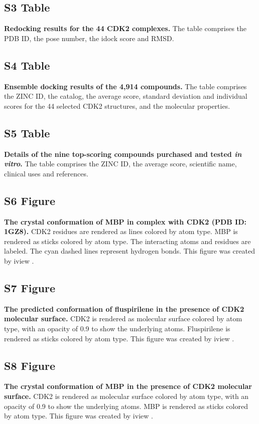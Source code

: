 \documentclass[10pt,letterpaper]{article}
\begin{document}
\subsection*{S3 Table}
\label{S3_Table}
{\bf Redocking results for the 44 CDK2 complexes.} The table comprises the PDB ID, the pose number, the idock score and RMSD.%

\subsection*{S4 Table}
\label{S4_Table}
{\bf Ensemble docking results of the 4,914 compounds.} The table comprises the ZINC ID, the catalog, the average score, standard deviation and individual scores for the 44 selected CDK2 structures, and the molecular properties.%

\subsection*{S5 Table}
\label{S5_Table}
{\bf Details of the nine top-scoring compounds purchased and tested \textit{in vitro}.} The table comprises the ZINC ID, the average score, scientific name, clinical uses and references.%

\subsection*{S6 Figure}
\label{S6_Figure}
{\bf The crystal conformation of MBP in complex with CDK2 (PDB ID: 1GZ8).} CDK2 residues are rendered as lines colored by atom type. MBP is rendered as sticks colored by atom type. The interacting atoms and residues are labeled. The cyan dashed lines represent hydrogen bonds. This figure was created by iview \cite{1366}.%

\subsection*{S7 Figure}
\label{S7_Figure}
{\bf The predicted conformation of fluspirilene in the presence of CDK2 molecular surface.} CDK2 is rendered as molecular surface colored by atom type, with an opacity of 0.9 to show the underlying atoms. Fluspirilene is rendered as sticks colored by atom type. This figure was created by iview \cite{1366}.%

\subsection*{S8 Figure}
\label{S8_Figure}
{\bf The crystal conformation of MBP in the presence of CDK2 molecular surface.} CDK2 is rendered as molecular surface colored by atom type, with an opacity of 0.9 to show the underlying atoms. MBP is rendered as sticks colored by atom type. This figure was created by iview \cite{1366}.%
\end{document}
